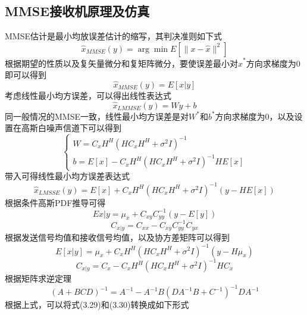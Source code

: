 \documentclass[bachelor,nocolorlinks, printoneside]{seuthesis} %
\begin{document}
\begin{Main}
\section{MMSE接收机原理及仿真}
MMSE估计是最小均放误差估计的缩写，其判决准则如下式
\begin{equation}\label{key}
\hat{x}_{MMSE}(y) = \arg \min E[\| x - \hat{x} \|^{2}]
\end{equation}
根据期望的性质以及复矢量微分和复矩阵微分，要使误差最小对$\hat{x}^{*}$方向求梯度为0即可以得到
\begin{equation}\label{key}
\hat{x}_{MMSE}(y) = E[x|y]
\end{equation}
考虑线性最小均方误差，可以得出线性表达式
\begin{equation}\label{key}
\hat{x}_{LMMSE}(y)=Wy+b
\end{equation}
同一般情况的MMSE一致，线性最小均方误差是对$W^{*}$和$b^{*}$方向求梯度为0，以及设置在高斯白噪声信道下可以得到
\begin{equation}\label{key}
\left\{
\begin{array}{l}
W=C_{x}H^{H}(HC_{x}H^{H} + \sigma^{2}I)^{-1} \\
b=E[x] - C_{x}H^{H}(HC_{x}H^{H} + \sigma^{2}I)^{-1}HE[x]
\end{array}
\right.
\end{equation}
带入可得线性最小均方误差表达式
\begin{equation}\label{key}
\hat{x}_{LMSSE}(y)=E[x]+C_{x}H^{H}(HC_{x}H^{H}+\sigma^{2}I)^{-1}(y-HE[x])
\end{equation}
根据条件高斯PDF推导可得
\begin{equation}\label{key}
E{x|y}=\mu_{x}+C_{xy}C_{yy}^{-1}(y-E[y])
\end{equation}
\begin{equation}\label{key}
C_{x|y} = C_{xx} -C_{xy}C_{yy}^{-1}C_{yx}
\end{equation}
根据发送信号均值和接收信号均值，以及协方差矩阵可以得到
\begin{equation}\label{key}
E[x|y]=\mu_{x} + C_{x}H^{H}(HC_{x}H^{H}+\sigma^{2}I)^{-1}(y-H\mu_{x})
\end{equation}
\begin{equation}\label{key}
C_{x|y}=C_{x}-C_{x}H^{H}(HC_{x}H^{H}+\sigma^{2}I)^{-1}HC_{x}
\end{equation}
根据矩阵求逆定理
\begin{equation}\label{key}
(A + BCD)^{-1} = A^{-1} - A^{-1}B(DA^{-1}B+C^{-1})^{-1}DA^{-1}
\end{equation}
根据上式，可以将式(3.29)和(3.30)转换成如下形式

\end{Main}
\end{document}
